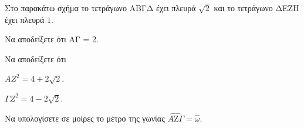Στο παρακάτω σχήμα το τετράγωνο ΑΒΓΔ έχει πλευρά $\sqrt{2}$ και το τετράγωνο ΔΕΖΗ έχει πλευρά $1$.
\begin{alist}
    \item Να αποδείξετε ότι ΑΓ = 2. 
    \item Να αποδείξετε ότι
    \begin{rlist}
        \item $AZ^2 = 4 + 2\sqrt{2}$. 
        \item $\Gamma Z^2 = 4 - 2\sqrt{2}$. 
    \end{rlist}
    \item Να υπολογίσετε σε μοίρες το μέτρο της γωνίας $\hat{A\text{Z}\Gamma} = \hat{\omega}$. 
\end{alist}